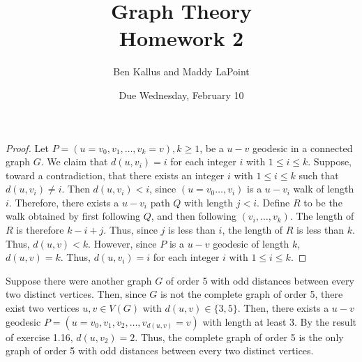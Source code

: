 \documentclass[12pt]{article}
\title{Graph Theory \\ Homework 2}
\author{Ben Kallus and Maddy LaPoint}
\date{Due Wednesday, February 10}
\begin{document}
\pagecolor{black}
\color{white}
\maketitle

\begin{proof}
    Let $P = (u = v_0, v_1, \hdots, v_k = v), k \geq 1$, be a $u-v$ geodesic in a connected graph $G$.
    We claim that $d(u,v_i)=i$ for each integer $i$ with $1 \leq i \leq k$.
    Suppose, toward a contradiction, that there exists an integer $i$ with $1 \leq i \leq k$ such that $d(u,v_i) \neq i$.
    Then $d(u,v_i) < i$, since $(u = v_0 \hdots, v_i)$ is a $u-v_i$ walk of length $i$.
    Therefore, there exists a $u-v_i$ path $Q$ with length $j < i$.
    Define $R$ to be the walk obtained by first following $Q$, and then following $(v_i, \hdots, v_k)$.
    The length of $R$ is therefore $k - i + j$.
    Thus, since $j$ is less than $i$, the length of $R$ is less than $k$.
    Thus, $d(u,v) < k$.
    However, since $P$ is a $u-v$ geodesic of length $k$, $d(u,v)=k$.
    Thus, $d(u,v_i)=i$ for each integer $i$ with $1 \leq i \leq k$.
\end{proof}

\bigskip
{}
\begin{center}
\end{center}

    Suppose there were another graph $G$ of order 5 with odd distances between every two distinct vertices.
    Then, since $G$ is not the complete graph of order 5, there exist two vertices $u,v \in V(G)$ with $d(u,v) \in \{3,5\}$.
    Then, there exists a $u-v$ geodesic $P = (u=v_0, v_1, v_2, \hdots, v_{d(u,v)}=v)$ with length at least 3.
    By the result of exercise 1.16, $d(u,v_2) = 2$.
    Thus, the complete graph of order 5 is the only graph of order 5 with odd distances between every two distinct vertices.

\newpage
{}
\end{document}
